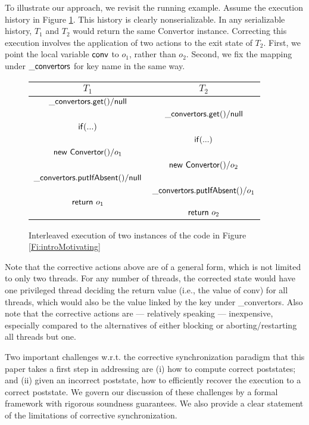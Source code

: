 To illustrate our approach, we revisit the running example. Assume the execution history in Figure \ref{Fi:motivatingInterleaving}.
This history is clearly nonserializable. In any serializable history, $T_1$ and $T_2$ would return the same {\sf Convertor} instance. Correcting this execution involves the application of two actions to the exit state of $T_2$. First, we point the local variable ${\sf conv}$ to $o_1$, rather than $o_2$. Second, we fix the mapping under ${\sf \_convertors}$ for key {\sf name} in the same way.

\begin{figure}
	\begin{center}
		\begin{tabular}{c||c}
			$T_1$ & $T_2$ \\
			\hline
			${\sf \_convertors.get()} / {\sf null}$ &  \\
			& ${\sf \_convertors.get()} / {\sf null}$ \\
			${\sf if (...)}$ 								   &							\\
			& ${\sf if (...)}$ \\
			${\sf new\ Convertor()} / o_1$		& \\
			& ${\sf new\ Convertor()} / o_2$ \\
			${\sf \_convertors.putIfAbsent()} / {\sf null}$ &  \\
			& 		${\sf \_convertors.putIfAbsent()} / o_1$ \\
			${\sf return}\ o_1$ & \\
			& ${\sf return}\ o_2$ \\
			\end{tabular}
			\end{center}
	\caption{\label{Fi:motivatingInterleaving}Interleaved execution of two instances of the code in Figure \ref{Fi:introMotivating}}
\end{figure}

Note that the corrective actions above are of a general form, which is not limited to only two threads. For any number of threads, the corrected state would have one privileged thread deciding the return value (i.e., the value of {\sf conv}) for all threads, which would also be the value linked by the key under {\sf \_convertors}. Also note that the corrective actions are --- relatively speaking --- inexpensive, especially compared to the alternatives of either blocking or aborting/restarting all threads but one.

Two important challenges w.r.t. the corrective synchronization paradigm that this paper takes a first step in addressing are (i) how to compute correct poststates; and (ii) given an incorrect poststate, how to efficiently recover the execution to a correct poststate. We govern our discussion of these challenges by a formal framework with rigorous soundness guarantees. We also provide a clear statement of the limitations of corrective synchronization.

